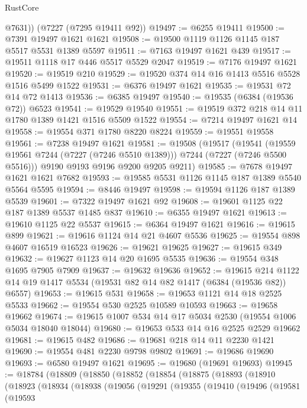 \begin{lexlean}{RustCore}
\begin{coremodule}
        @7631))
    (@7227 (@7295 @19411 @92))
@19497 := @6255 @19411
@19500 := @7391 @19497 @1621 @1621
@19508 := @19500 @1119 @1126 @1145 @187 @5517 @5531 @1389 @5597
@19511 := @7163 @19497 @1621 @439
@19517 := @19511 @1118 @17 @446 @5517 @5529 @2047
@19519 := @7176 @19497 @1621
@19520 := @19519 @210
@19529 := @19520 @374 @14 @16 @1413 @5516 @5528 @1516 @5499 @1522
@19531 := @6376 @19497 @1621
@19535 := @19531 @72 @14 @72 @1413
@19536 := @6385 @19497
@19540 := @19535 (@6384 (@19536 @72)) @6523
@19541 := @19529 @19540
@19551 := @19519 @372 @218 @14 @11 @1780 @1389 @1421 @1516 @5509 @1522
@19554 := @7214 @19497 @1621 @14
@19558 := @19554 @371 @1780 @8220 @8224
@19559 := @19551 @19558
@19561 := @7238 @19497 @1621
@19581 := @19508
    (@19517
      (@19541 (@19559 @19561 @7244 (@7227 (@7246 @5510 @1389))) @7244 (@7227 (@7246 @5500 @5516)))
      @9190
      @9193
      @9196
      @9200
      @9205
      @9211)
@19585 := @7678 @19497 @1621 @1621 @7682
@19593 := @19585 @5531 @1126 @1145 @187 @1389 @5540 @5564 @5595
@19594 := @8446 @19497
@19598 := @19594 @1126 @187 @1389 @5539
@19601 := @7322 @19497 @1621 @92
@19608 := @19601 @1125 @22 @187 @1389 @5537 @1485 @837
@19610 := @6355 @19497 @1621
@19613 := @19610 @1125 @22 @5537
@19615 := @6364 @19497 @1621
@19616 := @19615 @899
@19621 := @19616 @1124 @14 @21 @4607 @5536
@19625 := @19554 @898 @4607 @16519 @16523
@19626 := @19621 @19625
@19627 := @19615 @349
@19632 := @19627 @1123 @14 @20 @1695 @5535
@19636 := @19554 @348 @1695 @7905 @7909
@19637 := @19632 @19636
@19652 := @19615
    @214
    @1122
    @14
    @19
    @1417
    @5534
    (@19531 @82 @14 @82 @1417 (@6384 (@19536 @82)) @6557)
@19653 := @19615 @531
@19658 := @19653 @1121 @14 @18 @2525 @5533
@19662 := @19554 @530 @2525 @10589 @10593
@19663 := @19658 @19662
@19674 := @19615 @1007 @534 @14 @17 @5034 @2530 (@19554 @1006 @5034 @18040 @18044)
@19680 := @19653 @533 @14 @16 @2525 @2529 @19662
@19681 := @19615 @482
@19686 := @19681 @218 @14 @11 @2230 @1421
@19690 := @19554 @481 @2230 @9798 @9802
@19691 := @19686 @19690
@19693 := @6580 @19497 @1621
@19695 := @19680 (@19691 @19693)
@19945 := @18784
    (@18809
      (@18850
        (@18852
          (@18854
            (@18875
              (@18893
                (@18910
                  (@18923
                    (@18934
                      (@18938
                        (@19056
                          (@19291
                            (@19355
                              (@19410
                                (@19496
                                  (@19581
                                    (@19593

\end{coremodule}
\end{lexlean}
